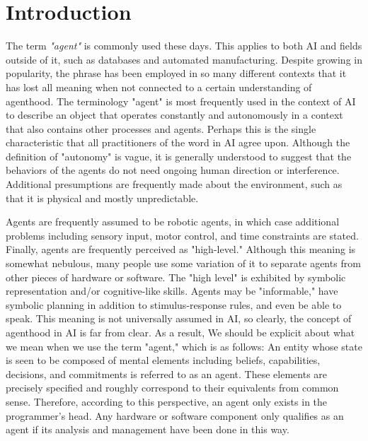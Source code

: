 
\ifx\doclanguage\english
\chapter{Introduction}

The term \textit{"agent"} is commonly used these days. This applies to both \ac{AI} and fields outside of it, such as databases and automated manufacturing. Despite growing in popularity, the phrase has been employed in so many different contexts that it has lost all meaning when not connected to a certain understanding of agenthood. The terminology "agent" is most frequently used in the context of  \ac{AI} to describe an object that operates constantly and autonomously in a context that also contains other processes and agents.
Perhaps this is the single characteristic that all practitioners of the word in \ac{AI} agree upon. Although the definition of "autonomy" is vague, it is generally understood to suggest that the behaviors of the agents do not need ongoing human direction or interference. Additional presumptions are frequently made about the environment, such as that it is physical and mostly unpredictable.

\vspace{.5cm}

Agents are frequently assumed to be robotic agents, in which case additional problems including sensory input, motor control, and time constraints are stated. Finally, agents are frequently perceived as "high-level." Although this meaning is somewhat nebulous, many people use some variation of it to separate agents from other pieces of hardware or software. The "high level" is exhibited by symbolic representation and/or cognitive-like skills. Agents may be "informable," have symbolic planning in addition to stimulus-response rules, and even be able to speak. This meaning is not universally assumed in \ac{AI}, so clearly, the concept of agenthood in \ac{AI} is far from clear. As a result, We should be explicit about what we mean when we use the term "agent," which is as follows: An entity whose state is seen to be composed of mental elements including beliefs, capabilities, decisions, and commitments is referred to as an agent. These elements are precisely specified and roughly correspond to their equivalents from common sense. Therefore, according to this perspective, an agent only exists in the programmer's head. Any hardware or software component only qualifies as an agent if its analysis and management have been done in this way.

